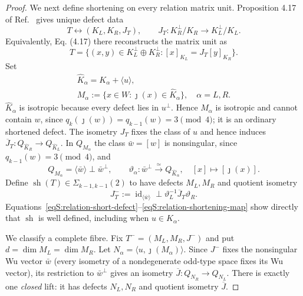 \documentclass[journal,twocolumn]{IEEEtran}
\theoremstyle{definition}
\theoremstyle{plain}
\newcommand{\id}{\operatorname{id}}
\begin{document}
\begin{proof}
We next define shortening on every relation matrix unit.  Proposition 4.17
of Ref.~\cite{GrossNezamiWalter2021} gives unique defect data
\begin{equation}
 T\longleftrightarrow(K_L,K_R,J_T),\qquad
 J_T:K_R^\perp/K_R\longrightarrow K_L^\perp/K_L.
 \label{eqS:relation-defect-data}
\end{equation}
Equivalently, Eq. (4.17) there reconstructs the matrix unit as
\begin{equation}
 T=\{(x,y)\in K_L^\perp\oplus K_R^\perp:
             [x]_{K_L}=J_T[y]_{K_R}\}.
 \label{eqS:relation-from-defect-data}
\end{equation}
Set
\begin{equation}
 \begin{gathered}
 \widehat K_\alpha=K_\alpha+\langle u\rangle,\\
 M_\alpha:=\{x\in W:\jmath(x)\in\widehat K_\alpha\},
 \quad\alpha=L,R.
 \end{gathered}
 \label{eqS:relation-short-defect}
\end{equation}
$\widehat K_\alpha$ is isotropic because every defect lies in $u^\perp$.
Hence $M_\alpha$ is isotropic and cannot contain $w$, since
$q_k(\jmath(w))=q_{k-1}(w)=3\pmod4$; it is an ordinary shortened defect.
The isometry $J_T$ fixes the class of $u$ and hence induces
$\overline J_T:Q_{\widehat K_R}\to Q_{\widehat K_L}$.  In $Q_{M_\alpha}$
the class $\bar w=[w]$ is nonsingular, since $q_{k-1}(w)=3\pmod4$, and
\begin{equation}
 Q_{M_\alpha}=\langle\bar w\rangle\perp\bar w^\perp,
 \qquad
 \vartheta_\alpha:\bar w^\perp\xrightarrow{\simeq}Q_{\widehat K_\alpha},
 \quad[x]\longmapsto[\jmath(x)].
 \label{eqS:shortened-quotient}
\end{equation}
Define $\operatorname{sh}(T)\in\Sigma_{k-1,k-1}(2)$ to have defects
$M_L,M_R$ and quotient isometry
\begin{equation}
 J_T^-:=\id_{\langle\bar w\rangle}\perp
 \vartheta_L^{-1}\overline J_T\vartheta_R.
 \label{eqS:relation-shortening-map}
\end{equation}
Equations~\eqref{eqS:relation-short-defect}--\eqref{eqS:relation-shortening-map}
show directly that $\operatorname{sh}$ is well defined, including when
$u\in K_\alpha$.

We classify a complete fibre.  Fix
$T^-=(M_L,M_R,J^-)$ and put
$d=\dim M_L=\dim M_R$.  Let
$N_\alpha=\langle u,\jmath(M_\alpha)\rangle$.  Since $J^-$ fixes the
nonsingular Wu vector $\bar w$ (every isometry of a nondegenerate odd-type
space fixes its Wu vector), its restriction to
$\bar w^\perp$ gives an isometry
$\overline J:Q_{N_R}\to Q_{N_L}$.  There is exactly one
\emph{closed} lift: it has defects $N_L,N_R$ and quotient isometry
$\overline J$.


\end{proof}
\end{document}
